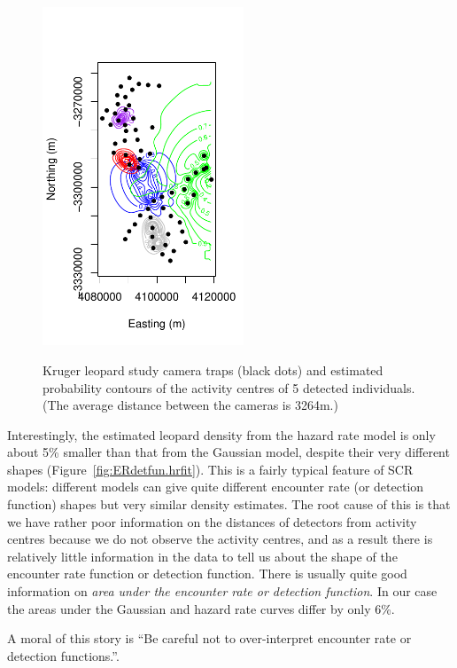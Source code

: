 \documentclass[graybox,envcountchap,sectrefs]{SpringerStyleFiles/styles/svmono}\usepackage[]{graphicx}\usepackage[]{color}
\begin{document}
\begin{figure}[ht]
\caption{\small Kruger leopard study camera traps (black dots) and estimated probability contours of the activity centres of 5 detected individuals. (The average distance between the cameras is 3264m.)}
\centering
\vspace{-24pt}
\includegraphics[width=6cm]{keepfigure/ERdetfun-locest.pdf}
\label{fig:ERdetfun-locest}
\end{figure}

Interestingly, the estimated leopard density from the hazard rate model is only about 5\% smaller than that from the Gaussian model, despite their very different shapes (Figure~\ref{fig:ERdetfun.hrfit}). This is a fairly typical feature of SCR models: different models can give quite different encounter rate (or detection function) shapes but very similar density estimates. The root cause of this is that  we have rather poor information on the distances of detectors from activity centres because we do not observe the activity centres, and as a result there is relatively little information in the data to tell us about the shape of the encounter rate function or detection function. There is usually quite good information on \textit{area under the encounter rate or detection function}. In our case the areas under the Gaussian and hazard rate curves differ by only 6\%. 

A moral of this story is ``Be careful not to over-interpret encounter rate or detection functions.''.
\end{document}
